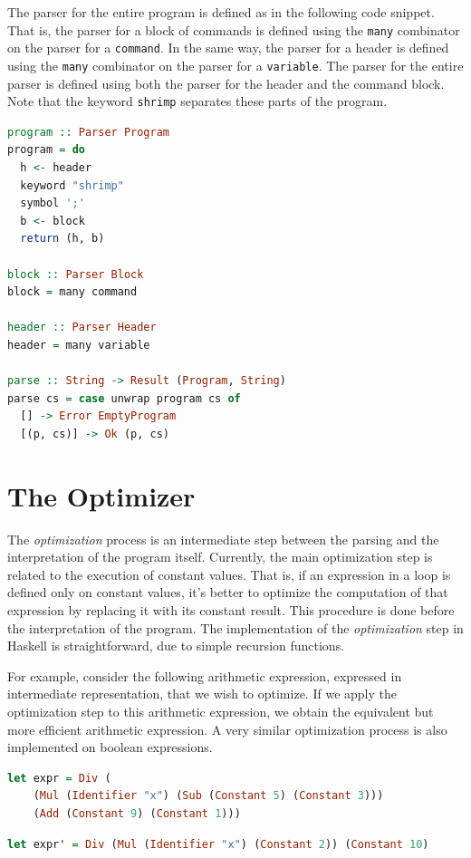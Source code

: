 \documentclass[12pt,a4paper]{article}
\begin{document}
The parser for the entire program is defined as in the following code snippet.
That is, the parser for a block of commands is defined using the \texttt{many} combinator on the parser for a \texttt{command}.
In the same way, the parser for a header is defined using the \texttt{many} combinator on the parser for a \texttt{variable}.
The parser for the entire parser is defined using both the parser for the header and the command block.
Note that the keyword \texttt{shrimp} separates these parts of the program.
\begin{lstlisting}[language=Haskell, style=custom-style]
program :: Parser Program
program = do
  h <- header
  keyword "shrimp"
  symbol ';'
  b <- block
  return (h, b)

block :: Parser Block
block = many command

header :: Parser Header
header = many variable

parse :: String -> Result (Program, String)
parse cs = case unwrap program cs of
  [] -> Error EmptyProgram
  [(p, cs)] -> Ok (p, cs)
\end{lstlisting}

\section*{The Optimizer}
The \textit{optimization} process is an intermediate step between the parsing and the interpretation of the program itself.
Currently, the main optimization step is related to the execution of constant values.
That is, if an expression in a loop is defined only on constant values, it's better to optimize the computation of that expression by replacing it with its constant result.
This procedure is done before the interpretation of the program.
The implementation of the \textit{optimization} step in Haskell is straightforward, due to simple recursion functions.

For example, consider the following arithmetic expression, expressed in intermediate representation, that we wish to optimize.
If we apply the optimization step to this arithmetic expression, we obtain the equivalent but more efficient arithmetic expression.
A very similar optimization process is also implemented on boolean expressions.
\begin{lstlisting}[language=Haskell, style=custom-style]
let expr = Div (
    (Mul (Identifier "x") (Sub (Constant 5) (Constant 3)))
    (Add (Constant 9) (Constant 1)))
\end{lstlisting}
\begin{lstlisting}[language=Haskell, style=custom-style]
let expr' = Div (Mul (Identifier "x") (Constant 2)) (Constant 10)
\end{lstlisting}
\end{document}
